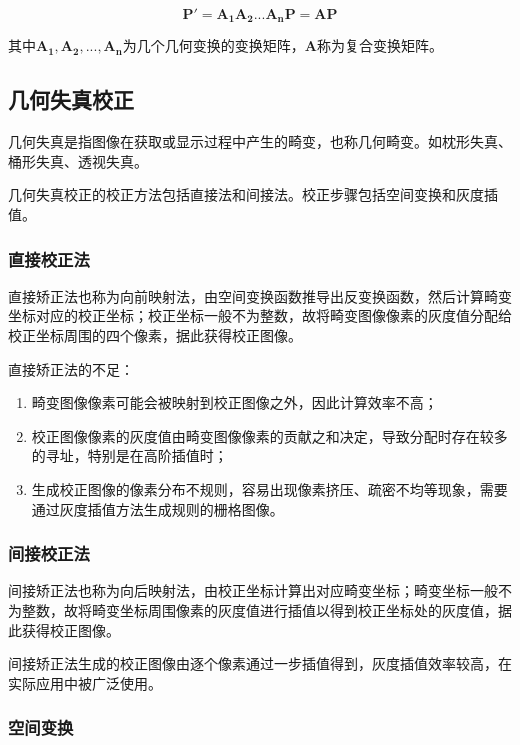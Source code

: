 \documentclass[cn, blue, normal, 12pt]{elegantnote}
\begin{document}
\begin{equation}
    \bm{P'}=\bm{A_1 A_2 ... A_n P}=\bm{AP}
\end{equation}

其中$\bm{A_1,A_2,...,A_n}$为几个几何变换的变换矩阵，$\bm{A}$称为复合变换矩阵。

\subsection{几何失真校正}

几何失真是指图像在获取或显示过程中产生的畸变，也称几何畸变。如枕形失真、桶形失真、透视失真。

几何失真校正的校正方法包括直接法和间接法。校正步骤包括空间变换和灰度插值。

\subsubsection{直接校正法}

直接矫正法也称为向前映射法，由空间变换函数推导出反变换函数，然后计算畸变坐标对应的校正坐标；校正坐标一般不为整数，故将畸变图像像素的灰度值分配给校正坐标周围的四个像素，据此获得校正图像。

直接矫正法的不足：

\begin{enumerate}
    \item 畸变图像像素可能会被映射到校正图像之外，因此计算效率不高；
    \item 校正图像像素的灰度值由畸变图像像素的贡献之和决定，导致分配时存在较多的寻址，特别是在高阶插值时；
    \item 生成校正图像的像素分布不规则，容易出现像素挤压、疏密不均等现象，需要通过灰度插值方法生成规则的栅格图像。
\end{enumerate}

\subsubsection{间接校正法}

间接矫正法也称为向后映射法，由校正坐标计算出对应畸变坐标；畸变坐标一般不为整数，故将畸变坐标周围像素的灰度值进行插值以得到校正坐标处的灰度值，据此获得校正图像。

间接矫正法生成的校正图像由逐个像素通过一步插值得到，灰度插值效率较高，在实际应用中被广泛使用。

\subsubsection{空间变换}
\end{document}
